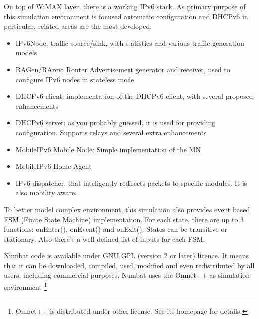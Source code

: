 On top of WiMAX layer, there is a working IPv6 stack. As primary
purpose of this simulation environment is focused automatic
configuration and DHCPv6 in particular, related areas are the most
developed:

\begin{itemize}
\item IPv6Node: traffic source/sink, with statistics and various traffic generation models
\item RAGen/RArcv: Router Advertisement generator and receiver, used to configure IPv6 nodes in stateless mode
\item DHCPv6 client: implementation of the DHCPv6 client, with several proposed enhancements
\item DHCPv6 server: as you probably guessed, it is used for providing configuration. Supports relays and several extra enhancements
\item MobileIPv6 Mobile Node: Simple implementation of the MN
\item MobileIPv6 Home Agent
\item IPv6 dispatcher, that inteligently redirects packets to specific
  modules. It is also mobility aware.
\end{itemize}

To better model complex environment, this simulation also provides
event based FSM (Finite State Machine) implementation. For each state,
there are up to 3 functions: onEnter(), onEvent() and onExit(). States
can be transitive or stationary. Also there's a well defined list of
inputs for each FSM.

Numbat code is available under GNU GPL (version 2 or later)
licence. It means that it can be downloaded, compiled, used, 
modified and even redistributed by all users, including commercial
purposes. Numbat uses the Omnet++ as simulation environment
\cite{omnet}\footnote{Omnet++ is distributed under other license. See
  its homepage for details.}
